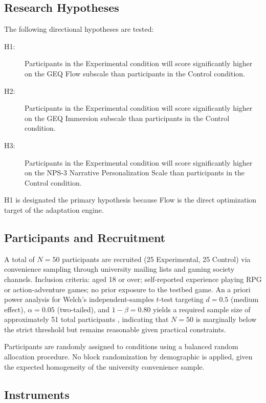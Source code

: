 \documentclass[12pt,a4paper]{report}
\begin{document}
\subsection{Research Hypotheses}

The following directional hypotheses are tested:

\begin{description}
\item[H1:] Participants in the Experimental condition will score significantly higher on the GEQ Flow subscale than participants in the Control condition.
\item[H2:] Participants in the Experimental condition will score significantly higher on the GEQ Immersion subscale than participants in the Control condition.
\item[H3:] Participants in the Experimental condition will score significantly higher on the NPS-3 Narrative Personalization Scale than participants in the Control condition.
\end{description}

H1 is designated the primary hypothesis because Flow is the direct optimization target of the adaptation engine.

\subsection{Participants and Recruitment}

A total of $N = 50$ participants are recruited (25 Experimental, 25 Control) via convenience sampling through university mailing lists and gaming society channels. Inclusion criteria: aged 18 or over; self-reported experience playing RPG or action-adventure games; no prior exposure to the testbed game. An a priori power analysis for Welch's independent-samples $t$-test targeting $d = 0.5$ (medium effect), $\alpha = 0.05$ (two-tailed), and $1 - \beta = 0.80$ yields a required sample size of approximately 51 total participants \citep{faul2007gpower}, indicating that $N = 50$ is marginally below the strict threshold but remains reasonable given practical constraints.

Participants are randomly assigned to conditions using a balanced random allocation procedure. No block randomization by demographic is applied, given the expected homogeneity of the university convenience sample.

\subsection{Instruments}
\end{document}
